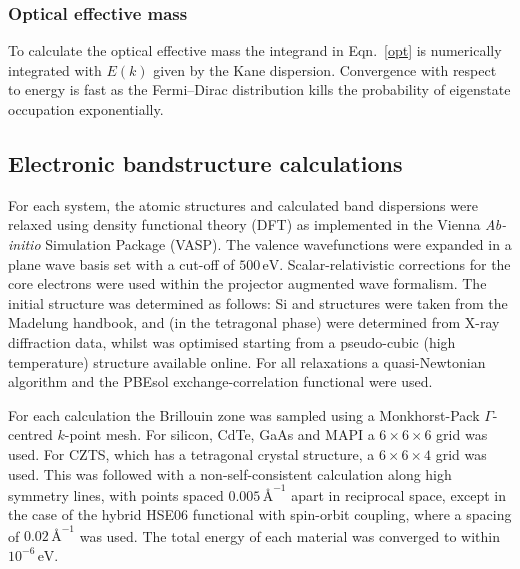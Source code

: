 \subsubsection{Optical effective mass}

To calculate the optical effective mass the integrand in Eqn.\ \ref{opt} is numerically integrated with $E(k)$ given by the Kane dispersion. Convergence with respect to energy is fast as the Fermi--Dirac distribution kills the probability of eigenstate occupation exponentially. 

\subsection{Electronic bandstructure calculations}

For each system, the atomic structures and calculated band dispersions were relaxed using density functional theory (DFT) as implemented in the Vienna \textit{Ab-initio} Simulation Package (\textsc{VASP}).\autocite{Kresse1996} The valence wavefunctions were expanded in a plane wave basis set with a cut-off of $500\,\mathrm{eV}$. Scalar-relativistic corrections for the core electrons were used within the projector augmented wave formalism.\autocite{Blochl1994}
The initial structure was determined as follows: Si and  structures were taken from the Madelung handbook,\autocite{Madelung2004}  \autocite{Rabadanov2001} and \autocite{Lafond2014} (in the tetragonal phase) were determined from X-ray diffraction data, whilst  was optimised starting from a pseudo-cubic (high temperature) structure available online.\autocite{WMD} For all relaxations a quasi-Newtonian algorithm and the PBEsol exchange-correlation functional were used.

For each calculation the Brillouin zone was sampled using a Monkhorst-Pack $\Gamma$-centred $k$-point mesh. For silicon, CdTe, GaAs and MAPI a $6\!\times\!6\!\times\!6$ grid was used. For CZTS, which has a tetragonal crystal structure, a $6\!\times\!6\!\times\!4$ grid was used. This was followed with a non-self-consistent calculation along high symmetry lines\autocite{Setyawan2010}, with points spaced $0.005\,\text{\AA}^{-1}$ apart in reciprocal space, except in the case of the hybrid HSE06 functional with spin-orbit coupling, where a spacing of $0.02\,\text{\AA}^{-1}$ was used. The total energy of each material was converged to within $10^{-6}\,\mathrm{eV}$.

